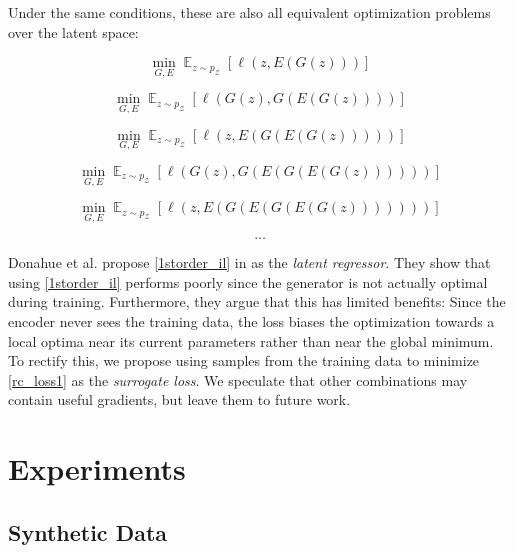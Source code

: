 \documentclass[10pt,twocolumn,letterpaper]{article}
\DeclareMathOperator*{\E}{\mathbb{E}}
\begin{document}
Under the same conditions, these are also all equivalent optimization problems over the latent space:

\begin{equation}
    \min_{G, E} \E_{z\sim p_{\mathcal{Z}}}\left[ \ell(z, E(G(z))) \right]
    \label{1storder_il}
\end{equation}

\begin{equation}
    \min_{G, E} \E_{z\sim p_{\mathcal{Z}}}\left[ \ell(G(z), G(E(G(z)))) \right]
    \label{1storder_rl}
\end{equation}

\begin{equation}
    \min_{G, E} \E_{z\sim p_{\mathcal{Z}}}\left[ \ell(z, E(G(E(G(z))))) \right]
\end{equation}

\begin{equation}
    \min_{G, E} \E_{z\sim p_{\mathcal{Z}}}\left[ \ell(G(z), G(E(G(E(G(z)))))) \right]
\end{equation}

\begin{equation}
    \min_{G, E} \E_{z\sim p_{\mathcal{Z}}}\left[ \ell(z, E(G(E(G(E(G(z))))))) \right]
\end{equation}

\begin{equation*}
    \dots
\end{equation*}

Donahue et al. propose \eqref{1storder_il} in \cite{donahue2016bigan} as the \textit{latent regressor}. They show that using \eqref{1storder_il} performs poorly since the generator is not actually optimal during training. Furthermore, they argue that this has limited benefits: Since the encoder never sees the training data, the loss biases the optimization towards a local optima near its current parameters rather than near the global minimum. To rectify this, we propose using samples from the training data to minimize \eqref{rc_loss1} as the \textit{surrogate loss}. We speculate that other combinations may contain useful gradients, but leave them to future work.

\section{Experiments}

\subsection{Synthetic Data}
\end{document}
